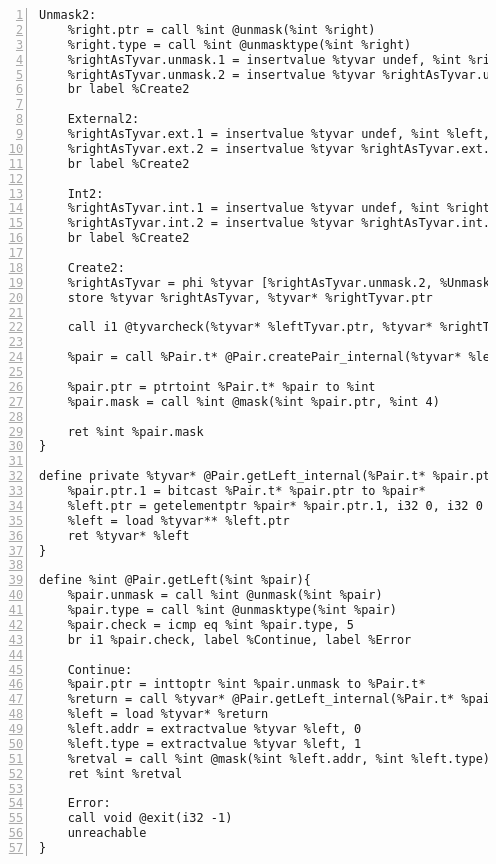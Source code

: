 \begin{lstlisting}[frame=single,numbers=left, language={[x86masm]Assembler}, caption={[Pair Structure: LLVM]Translation of the Pair structure.},
label=llvm:polymorphic]
	Unmask2:
	%right.ptr = call %int @unmask(%int %right)
	%right.type = call %int @unmasktype(%int %right)
	%rightAsTyvar.unmask.1 = insertvalue %tyvar undef, %int %right.ptr, 0
	%rightAsTyvar.unmask.2 = insertvalue %tyvar %rightAsTyvar.unmask.1, %int %right.type, 1
	br label %Create2

	External2:
	%rightAsTyvar.ext.1 = insertvalue %tyvar undef, %int %left, 0
	%rightAsTyvar.ext.2 = insertvalue %tyvar %rightAsTyvar.ext.1, %int 0, 1
	br label %Create2

	Int2:
	%rightAsTyvar.int.1 = insertvalue %tyvar undef, %int %right, 0
	%rightAsTyvar.int.2 = insertvalue %tyvar %rightAsTyvar.int.1, %int 1, 1
	br label %Create2

	Create2:
	%rightAsTyvar = phi %tyvar [%rightAsTyvar.unmask.2, %Unmask1], [%rightAsTyvar.ext.2, %External1], [%rightAsTyvar.int.2,%Int1]
	store %tyvar %rightAsTyvar, %tyvar* %rightTyvar.ptr

	call i1 @tyvarcheck(%tyvar* %leftTyvar.ptr, %tyvar* %rightTyvar.ptr) ; type equation

	%pair = call %Pair.t* @Pair.createPair_internal(%tyvar* %leftTyvar.ptr, %tyvar* %rightTyvar.ptr)

	%pair.ptr = ptrtoint %Pair.t* %pair to %int
	%pair.mask = call %int @mask(%int %pair.ptr, %int 4)

	ret %int %pair.mask
}

define private %tyvar* @Pair.getLeft_internal(%Pair.t* %pair.ptr){
	%pair.ptr.1 = bitcast %Pair.t* %pair.ptr to %pair*
	%left.ptr = getelementptr %pair* %pair.ptr.1, i32 0, i32 0 ;%tyvar**
	%left = load %tyvar** %left.ptr
	ret %tyvar* %left
}

define %int @Pair.getLeft(%int %pair){
	%pair.unmask = call %int @unmask(%int %pair)
	%pair.type = call %int @unmasktype(%int %pair)
	%pair.check = icmp eq %int %pair.type, 5
	br i1 %pair.check, label %Continue, label %Error

	Continue:
	%pair.ptr = inttoptr %int %pair.unmask to %Pair.t*
	%return = call %tyvar* @Pair.getLeft_internal(%Pair.t* %pair.ptr)
	%left = load %tyvar* %return
	%left.addr = extractvalue %tyvar %left, 0
	%left.type = extractvalue %tyvar %left, 1
	%retval = call %int @mask(%int %left.addr, %int %left.type)
	ret %int %retval

	Error:
	call void @exit(i32 -1)
	unreachable
}
\end{lstlisting}
